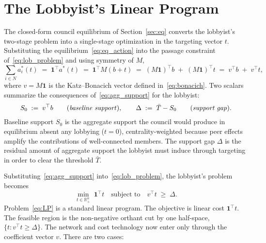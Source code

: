 \documentclass[11pt,letterpaper]{article}
\theoremstyle{plain}
\theoremstyle{definition}
\theoremstyle{remark}
\begin{document}

\section{The Lobbyist's Linear Program}
\label{sec:lp}

The closed-form council equilibrium of Section~\ref{sec:eq} converts the lobbyist's two-stage problem into a single-stage optimization in the targeting vector $t$. Substituting the equilibrium~\eqref{eq:eq_action} into the passage constraint of~\eqref{eq:lob_problem} and using symmetry of $M$,
\begin{equation}
\sum_{i \in N} a_i^*(t) \;=\; \mathbf{1}^\top a^*(t) \;=\; \mathbf{1}^\top M (b + t) \;=\; (M \mathbf{1})^\top b \;+\; (M\mathbf{1})^\top t \;=\; v^\top b \;+\; v^\top t,
\label{eq:agg_support}
\end{equation}
where $v = M\mathbf{1}$ is the Katz--Bonacich vector defined in~\eqref{eq:bonacich}. Two scalars summarize the consequences of~\eqref{eq:agg_support} for the lobbyist:
\begin{equation}
S_0 \;:=\; v^\top b
\qquad\text{(\emph{baseline support})}, \qquad
\Delta \;:=\; \bar T - S_0
\qquad\text{(\emph{support gap})}.
\label{eq:scalars}
\end{equation}
Baseline support $S_0$ is the aggregate support the council would produce in equilibrium absent any lobbying ($t = 0$), centrality-weighted because peer effects amplify the contributions of well-connected members. The support gap $\Delta$ is the residual amount of aggregate support the lobbyist must induce through targeting in order to clear the threshold $\bar T$.

Substituting~\eqref{eq:agg_support} into~\eqref{eq:lob_problem}, the lobbyist's problem becomes
\begin{equation}
\boxed{\;\min_{t \in \mathbb{R}^n_+}\; \mathbf{1}^\top t \quad \text{subject to} \quad v^\top t \;\geq\; \Delta. \;}
\label{eq:LP}
\end{equation}
Problem~\eqref{eq:LP} is a standard linear program. The objective is linear cost $\mathbf{1}^\top t$. The feasible region is the non-negative orthant cut by one half-space, $\{t : v^\top t \geq \Delta\}$. The network and cost technology now enter only through the coefficient vector $v$. There are two cases:
\end{document}

